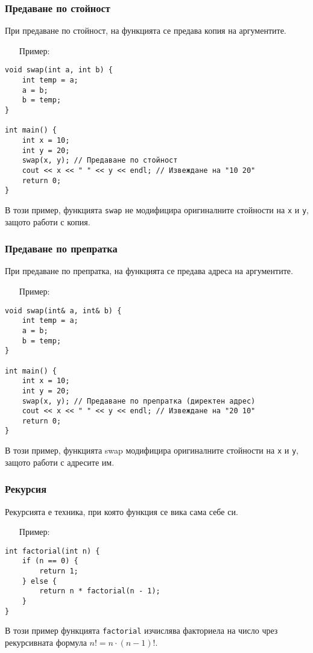 \documentclass[oneside]{book}
\newcommand*{\code}[1]{\texttt{#1}}
\begin{document}
\subsubsection{Предаване по стойност}
При предаване по стойност, на функцията се предава копия на аргументите.

\begin{itemize}
    \item[Пример:]
\end{itemize}
\begin{mdframed}\begin{lstlisting}
void swap(int a, int b) {
    int temp = a;
    a = b;
    b = temp;
}

int main() {
    int x = 10;
    int y = 20;
    swap(x, y); // Предаване по стойност
    cout << x << " " << y << endl; // Извеждане на "10 20"
    return 0;
}
\end{lstlisting}\end{mdframed}
В този пример, функцията \code{swap} не модифицира оригиналните стойности на \code{x} и \code{y}, защото работи с копия.

\subsubsection{Предаване по препратка}
При предаване по препратка, на функцията се предава адреса на аргументите.
\pagebreak
\begin{itemize}
    \item[Пример:]
\end{itemize}
\begin{mdframed}\begin{lstlisting}
void swap(int& a, int& b) {
    int temp = a;
    a = b;
    b = temp;
}
    
int main() {
    int x = 10;
    int y = 20;
    swap(x, y); // Предаване по препратка (директен адрес)
    cout << x << " " << y << endl; // Извеждане на "20 10"
    return 0;
}
\end{lstlisting}\end{mdframed}
В този пример, функцията swap модифицира оригиналните стойности на \code{x} и \code{y}, защото работи с адресите им.
\subsubsection{Рекурсия}
Рекурсията е техника, при която функция се вика сама себе си.

\begin{itemize}
    \item[Пример:]
\end{itemize}
\begin{mdframed}\begin{lstlisting}
int factorial(int n) {
    if (n == 0) {
        return 1;
    } else {
        return n * factorial(n - 1);
    }
}
\end{lstlisting}\end{mdframed}
В този пример функцията \code{factorial} изчислява факториела на число чрез рекурсивната формула $n! = n \cdot (n-1)!$.
\end{document}

